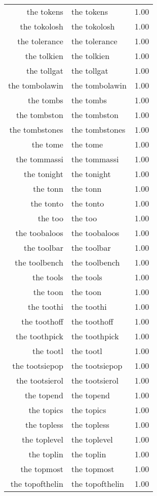 \begin{table}[ht]
\begin{tabular}{rlr}
  the tokens & the tokens & 1.00 \\ 
  the tokolosh & the tokolosh & 1.00 \\ 
  the tolerance & the tolerance & 1.00 \\ 
  the tolkien & the tolkien & 1.00 \\ 
  the tollgat & the tollgat & 1.00 \\ 
  the tombolawin & the tombolawin & 1.00 \\ 
  the tombs & the tombs & 1.00 \\ 
  the tombston & the tombston & 1.00 \\ 
  the tombstones & the tombstones & 1.00 \\ 
  the tome & the tome & 1.00 \\ 
  the tommassi & the tommassi & 1.00 \\ 
  the tonight & the tonight & 1.00 \\ 
  the tonn & the tonn & 1.00 \\ 
  the tonto & the tonto & 1.00 \\ 
  the too & the too & 1.00 \\ 
  the toobaloos & the toobaloos & 1.00 \\ 
  the toolbar & the toolbar & 1.00 \\ 
  the toolbench & the toolbench & 1.00 \\ 
  the tools & the tools & 1.00 \\ 
  the toon & the toon & 1.00 \\ 
  the toothi & the toothi & 1.00 \\ 
  the toothoff & the toothoff & 1.00 \\ 
  the toothpick & the toothpick & 1.00 \\ 
  the tootl & the tootl & 1.00 \\ 
  the tootsiepop & the tootsiepop & 1.00 \\ 
  the tootsierol & the tootsierol & 1.00 \\ 
  the topend & the topend & 1.00 \\ 
  the topics & the topics & 1.00 \\ 
  the topless & the topless & 1.00 \\ 
  the toplevel & the toplevel & 1.00 \\ 
  the toplin & the toplin & 1.00 \\ 
  the topmost & the topmost & 1.00 \\ 
  the topofthelin & the topofthelin & 1.00 \\ 

\end{tabular}
\end{table}
